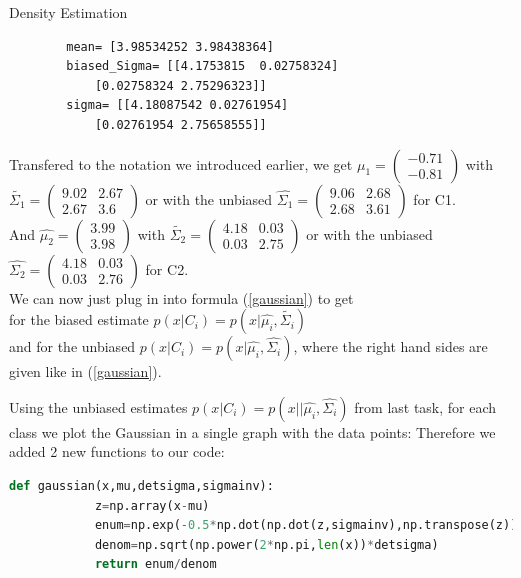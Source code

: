 \documentclass[
ngerman,
]{tudaexercise}
\begin{document}
\begin{task}{Density Estimation}
\begin{subtask}
\begin{lstlisting}
		mean= [3.98534252 3.98438364]
		biased_Sigma= [[4.1753815  0.02758324]
			[0.02758324 2.75296323]]
		sigma= [[4.18087542 0.02761954]
			[0.02761954 2.75658555]]
		\end{lstlisting}
		Transfered to the notation we introduced earlier, we get $\hat{\mu_1}=\begin{pmatrix}
		-0.71\\-0.81
		\end{pmatrix}$ with $\tilde{\Sigma_1}=\begin{pmatrix}
		9.02 & 2.67\\2.67 & 3.6
		\end{pmatrix}$ or with the unbiased $\hat{\Sigma_1}=\begin{pmatrix}9.06&2.68\\2.68&3.61
		\end{pmatrix}$ for C1.\\ And $\hat{\mu_2}=\begin{pmatrix}
		3.99\\3.98
		\end{pmatrix}$ with $\tilde{\Sigma_2}=\begin{pmatrix}
		4.18&0.03\\0.03&2.75
		\end{pmatrix}$ or with the unbiased $\hat{\Sigma_2}=\begin{pmatrix}		4.18&0.03\\0.03&2.76
		\end{pmatrix}$ for C2.\\
		We can now just plug in into formula (\ref{gaussian}) to get \\for the biased estimate $p(x|C_i)=p(x|\hat{\mu_i},\tilde{\Sigma_i})$ \\and for the unbiased $p(x|C_i)=p(x|\hat{\mu_i},\hat{\Sigma_i})$, where the right hand sides are given like in (\ref{gaussian}).
	\end{subtask}
\begin{subtask}
	Using the unbiased estimates $p(x|C_i)=p(x||\hat{\mu_i},\hat{\Sigma_i})$ from last task, for each class we plot the Gaussian in a single graph with the data points: Therefore we added 2 new functions to our code:
	\begin{lstlisting}[language=Python]
		def gaussian(x,mu,detsigma,sigmainv):
			z=np.array(x-mu)
			enum=np.exp(-0.5*np.dot(np.dot(z,sigmainv),np.transpose(z)))
			denom=np.sqrt(np.power(2*np.pi,len(x))*detsigma)
			return enum/denom
		

\end{lstlisting}
\end{subtask}
\end{task}
\end{document}
